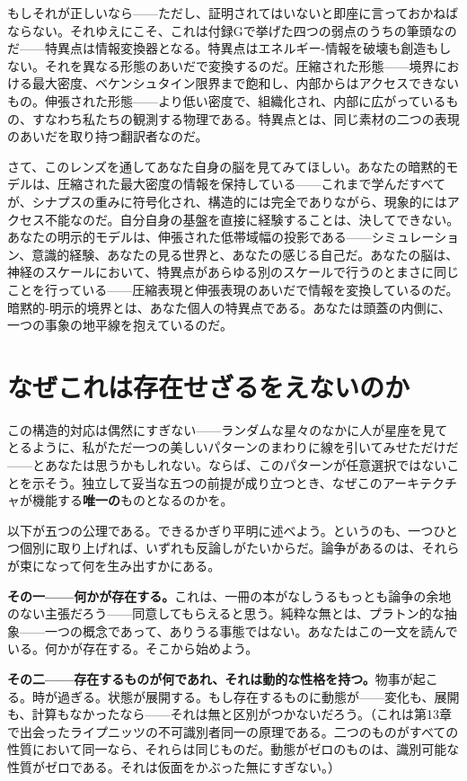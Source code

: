 \documentclass[11pt, twoside, openright]{book}
\begin{document}
もしそれが正しいなら------ただし、証明されてはいないと即座に言っておかねばならない。それゆえにこそ、これは付録Gで挙げた四つの弱点のうちの筆頭なのだ------特異点は情報変換器となる。特異点はエネルギー-情報を破壊も創造もしない。それを異なる形態のあいだで変換するのだ。圧縮された形態------境界における最大密度、ベケンシュタイン限界まで飽和し、内部からはアクセスできないもの。伸張された形態------より低い密度で、組織化され、内部に広がっているもの、すなわち私たちの観測する物理である。特異点とは、同じ素材の二つの表現のあいだを取り持つ翻訳者なのだ。

さて、このレンズを通してあなた自身の脳を見てみてほしい。あなたの暗黙的モデルは、圧縮された最大密度の情報を保持している------これまで学んだすべてが、シナプスの重みに符号化され、構造的には完全でありながら、現象的にはアクセス不能なのだ。自分自身の基盤を直接に経験することは、決してできない。あなたの明示的モデルは、伸張された低帯域幅の投影である------シミュレーション、意識的経験、あなたの見る世界と、あなたの感じる自己だ。あなたの脳は、神経のスケールにおいて、特異点があらゆる別のスケールで行うのとまさに同じことを行っている------圧縮表現と伸張表現のあいだで情報を変換しているのだ。暗黙的-明示的境界とは、あなた個人の特異点である。あなたは頭蓋の内側に、一つの事象の地平線を抱えているのだ。

\section*{なぜこれは存在せざるをえないのか}

この構造的対応は偶然にすぎない------ランダムな星々のなかに人が星座を見てとるように、私がただ一つの美しいパターンのまわりに線を引いてみせただけだ------とあなたは思うかもしれない。ならば、このパターンが任意選択ではないことを示そう。独立して妥当な五つの前提が成り立つとき、なぜこのアーキテクチャが機能する\textbf{唯一の}ものとなるのかを。

以下が五つの公理である。できるかぎり平明に述べよう。というのも、一つひとつ個別に取り上げれば、いずれも反論しがたいからだ。論争があるのは、それらが束になって何を生み出すかにある。

\textbf{その一------何かが存在する。}これは、一冊の本がなしうるもっとも論争の余地のない主張だろう------同意してもらえると思う。純粋な無とは、プラトン的な抽象------一つの概念であって、ありうる事態ではない。あなたはこの一文を読んでいる。何かが存在する。そこから始めよう。

\textbf{その二------存在するものが何であれ、それは動的な性格を持つ。}物事が起こる。時が過ぎる。状態が展開する。もし存在するものに動態が------変化も、展開も、計算もなかったなら------それは無と区別がつかないだろう。（これは第13章で出会ったライプニッツの不可識別者同一の原理である。二つのものがすべての性質において同一なら、それらは同じものだ。動態がゼロのものは、識別可能な性質がゼロである。それは仮面をかぶった無にすぎない。）
\end{document}
